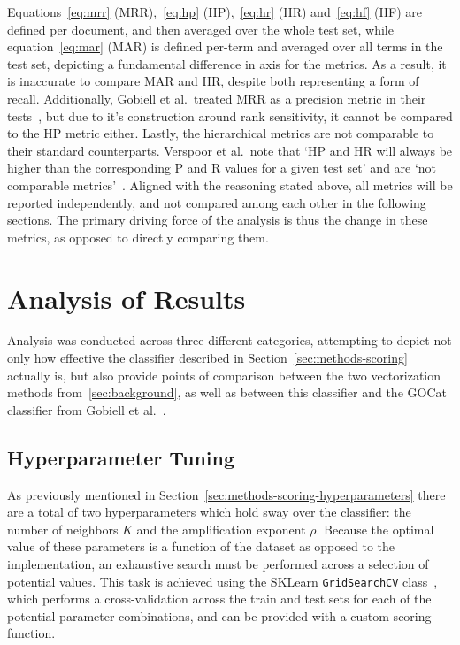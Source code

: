 \documentclass[11pt]{article}
\theoremstyle{plain}
\theoremstyle{definition}
\begin{document}
Equations~\ref{eq:mrr} (MRR),~\ref{eq:hp} (HP),~\ref{eq:hr} (HR) and~\ref{eq:hf} (HF) are defined per document, and then averaged over the whole test set, while equation~\ref{eq:mar} (MAR) is defined per-term and averaged over all terms in the test set, depicting a fundamental difference in axis for the metrics. As a result, it is inaccurate to compare MAR and HR, despite both representing a form of recall. Additionally, Gobiell et al.\ treated MRR as a precision metric in their tests~\cite{gobeill/2013/managing}, but due to it's construction around rank sensitivity, it cannot be compared to the HP metric either. Lastly, the hierarchical metrics are not comparable to their standard counterparts. Verspoor et al.\ note that `HP and HR will always be higher than the corresponding P and R values for a given test set' and are `not comparable metrics'~\cite{verspoor/2006/categorization}. Aligned with the reasoning stated above, all metrics will be reported independently, and not compared among each other in the following sections. The primary driving force of the analysis is thus the change in these metrics, as opposed to directly comparing them.

\section{Analysis of Results}\label{sec:analysis}

Analysis was conducted across three different categories, attempting to depict not only how effective the classifier described in Section~\ref{sec:methods-scoring} actually is, but also provide points of comparison between the two vectorization methods from~\ref{sec:background}, as well as between this classifier and the GOCat classifier from Gobiell et al.\ \cite{gobeill/2013/managing}.

\subsection{Hyperparameter Tuning}\label{sec:analsysis-tuning}

As previously mentioned in Section~\ref{sec:methods-scoring-hyperparameters} there are a total of two hyperparameters which hold sway over the classifier: the number of neighbors $K$ and the amplification exponent $\rho$. Because the optimal value of these parameters is a function of the dataset as opposed to the implementation, an exhaustive search must be performed across a selection of potential values. This task is achieved using the SKLearn \verb|GridSearchCV| class~\cite{sklearn/2026/gridsearchcv}, which performs a cross-validation across the train and test sets for each of the potential parameter combinations, and can be provided with a custom scoring function.
\end{document}
